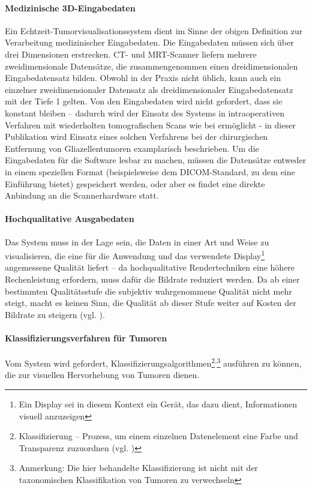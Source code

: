 \documentclass[ngerman,pdftex,paper=A4,DIV=calc,titlepage,12pt]{scrartcl}
\newtheorem[L]{boxedDefinition}{Definition}
\begin{document}
\paragraph{Medizinische 3D-Eingabedaten} Ein Echtzeit-Tumorvisualisationssystem dient im Sinne der obigen Definition zur Verarbeitung medizinischer Eingabedaten. Die Eingabedaten müssen sich über drei Dimensionen erstrecken. CT- und MRT-Scanner liefern mehrere zweidimensionale Datensätze, die zusammengenommen einen dreidimensionalen Eingabedatensatz bilden. Obwohl in der Praxis nicht üblich, kann auch ein einzelner zweidimensionaler Datensatz als dreidimensionaler Eingabedatensatz mit der Tiefe 1 gelten. Von den Eingabedaten wird nicht gefordert, dass sie konstant bleiben -- dadurch wird der Einsatz des Systems in intraoperativen Verfahren mit wiederholten tomografischen Scans wie bei \cite{Okudera1994} ermöglicht - in dieser Publikation wird Einsatz eines solchen Verfahrens bei der chirurgischen Entfernung von Gliazellentumoren examplarisch beschrieben. Um die Eingabedaten für die Software lesbar zu machen, müssen die Datensätze entweder in einem speziellen Format (beispielsweise dem DICOM-Standard, zu dem \cite{Mildenberger2002} eine Einführung bietet) gespeichert werden, oder aber es findet eine direkte Anbindung an die Scannerhardware statt.

\paragraph{Hochqualitative Ausgabedaten} Das System muss in der Lage sein, die Daten in einer Art und Weise zu visualisieren, die eine für die Anwendung und das verwendete Display\footnote{Ein Display sei in diesem Kontext ein Gerät, das dazu dient, Informationen visuell anzuzeigen} angemessene Qualität liefert -- da hochqualitative Rendertechniken eine höhere Rechenleistung erfordern, muss dafür die Bildrate reduziert werden. Da ab einer bestimmten Qualitätsstufe die subjektiv wahrgenommene Qualität nicht mehr steigt, macht es keinen Sinn, die Qualität ab dieser Stufe weiter auf Kosten der Bildrate zu steigern (vgl. \cite[Kapitel 3.3, Seite 5]{Kutter2008}).

\paragraph{Klassifizierungsverfahren für Tumoren}Vom System wird gefordert, Klassifizierungsalgorithmen\footnote{Klassifizierung -- Prozess, um einem einzelnen Datenelement eine Farbe und Transparenz zuzuordnen (vgl. \cite[Kapitel 3.2.2, Seite 28]{Bruckner2004})}\textsuperscript{,}\footnote{Anmerkung: Die hier behandelte Klassifizierung ist nicht mit der taxonomischen Klassifikation von Tumoren zu verwechseln} ausführen zu können, die zur visuellen Hervorhebung von Tumoren dienen.
\end{document}
